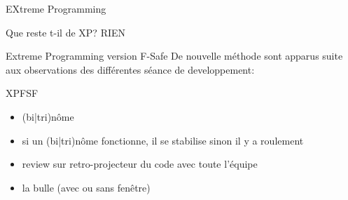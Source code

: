 \begin{frame}{EXtreme Programming}
  \begin{alertblock}{Que reste t-il de XP?}
    RIEN
  \end{alertblock}
\end{frame}


\begin{frame}{Extreme Programming version F-Safe}
  De nouvelle méthode sont apparus suite aux observations des différentes séance de developpement:
  \begin{exampleblock}{XPFSF}
    \begin{itemize}
    \item (bi|tri)nôme
    \item si un (bi|tri)nôme fonctionne, il se stabilise sinon il y a roulement
    \item review sur retro-projecteur du code avec toute l'équipe
    \item la bulle (avec ou sans fenêtre)
    \end{itemize}
  \end{exampleblock}
\end{frame}

